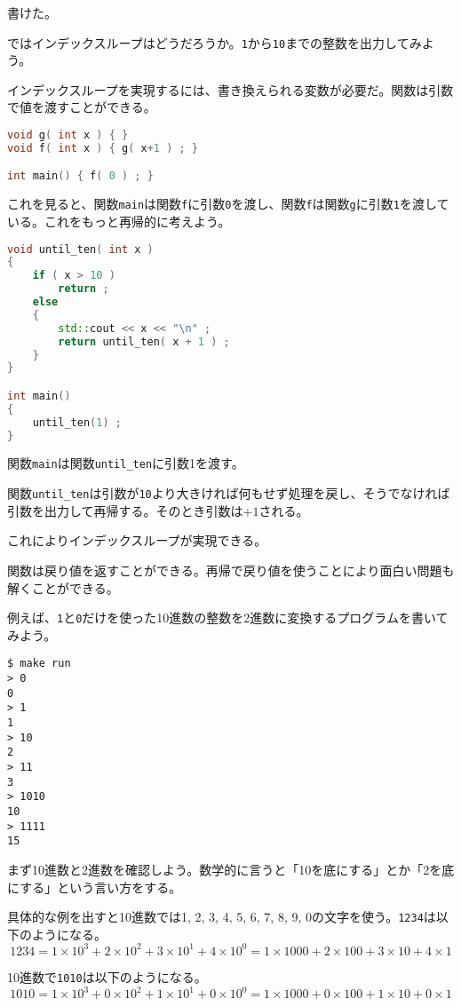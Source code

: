 書けた。

ではインデックスループはどうだろうか。\texttt{1}から\texttt{10}までの整数を出力してみよう。

インデックスループを実現するには、書き換えられる変数が必要だ。関数は引数で値を渡すことができる。

\begin{lstlisting}[language={C++}]
void g( int x ) { }
void f( int x ) { g( x+1 ) ; }

int main() { f( 0 ) ; }
\end{lstlisting}

これを見ると、関数\texttt{main}は関数\texttt{f}に引数\texttt{0}を渡し、関数\texttt{f}は関数\texttt{g}に引数\texttt{1}を渡している。これをもっと再帰的に考えよう。

\begin{lstlisting}[language={C++}]
void until_ten( int x )
{
    if ( x > 10 )
        return ;
    else
    {
        std::cout << x << "\n" ;
        return until_ten( x + 1 ) ;
    }
}

int main()
{
    until_ten(1) ;
}
\end{lstlisting}

関数\texttt{main}は関数\texttt{until\_ten}に引数1を渡す。

関数\texttt{until\_ten}は引数が\texttt{10}より大きければ何もせず処理を戻し、そうでなければ引数を出力して再帰する。そのとき引数は\(+1\)される。

これによりインデックスループが実現できる。

関数は戻り値を返すことができる。再帰で戻り値を使うことにより面白い問題も解くことができる。

例えば、\texttt{1}と\texttt{0}だけを使った10進数の整数を2進数に変換するプログラムを書いてみよう。

\begin{lstlisting}[style=terminal]
$ make run
> 0
0
> 1
1
> 10
2
> 11
3
> 1010
10
> 1111
15
\end{lstlisting}

まず10進数と2進数を確認しよう。数学的に言うと「10を底にする」とか「2を底にする」という言い方をする。

具体的な例を出すと10進数では1, 2, 3, 4, 5, 6, 7, 8, 9, 0の文字を使う。\texttt{1234}は以下のようになる。
\[
1234 = 1 \times 10^3 + 2 \times 10^2 + 3 \times 10^1 + 4 \times 10^0 = 1 \times 1000 + 2 \times 100 + 3 \times 10 + 4 \times 1
\]

10進数で\texttt{1010}は以下のようになる。
\[
1010 = 1 \times 10^3 + 0 \times 10^2 + 1 \times 10^1 + 0 \times 10^0 = 1 \times 1000 + 0 \times 100 + 1 \times 10 + 0 \times 1
\]

